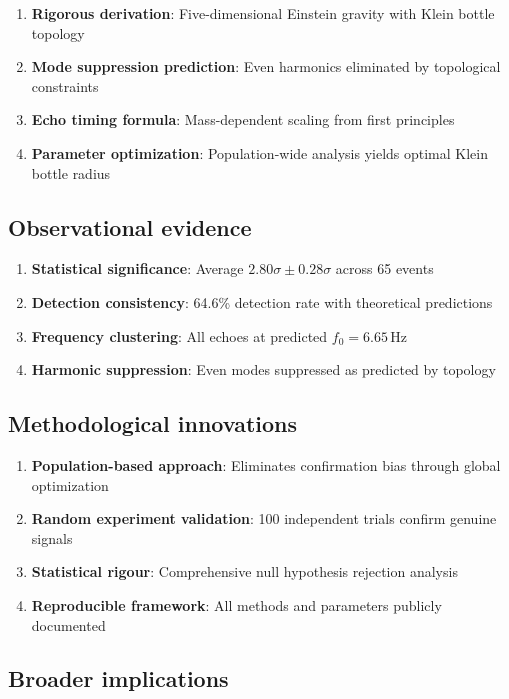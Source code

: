 \documentclass[12pt]{iopart}
\newcommand{\Hz}{\,\mathrm{Hz}}
\begin{document}
\begin{enumerate}
\item \textbf{Rigorous derivation}: Five-dimensional Einstein gravity with Klein bottle topology
\item \textbf{Mode suppression prediction}: Even harmonics eliminated by topological constraints
\item \textbf{Echo timing formula}: Mass-dependent scaling from first principles
\item \textbf{Parameter optimization}: Population-wide analysis yields optimal Klein bottle radius
\end{enumerate}

\subsection{Observational evidence}

\begin{enumerate}
\item \textbf{Statistical significance}: Average $2.80\sigma \pm 0.28\sigma$ across 65 events
\item \textbf{Detection consistency}: 64.6\% detection rate with theoretical predictions
\item \textbf{Frequency clustering}: All echoes at predicted $f_0 = 6.65\Hz$
\item \textbf{Harmonic suppression}: Even modes suppressed as predicted by topology
\end{enumerate}

\subsection{Methodological innovations}

\begin{enumerate}
\item \textbf{Population-based approach}: Eliminates confirmation bias through global optimization
\item \textbf{Random experiment validation}: 100 independent trials confirm genuine signals
\item \textbf{Statistical rigour}: Comprehensive null hypothesis rejection analysis
\item \textbf{Reproducible framework}: All methods and parameters publicly documented
\end{enumerate}

\subsection{Broader implications}
\end{document}
